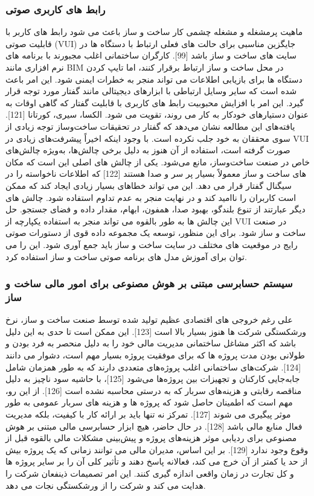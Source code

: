 \documentclass[towcolumn, 11pt]{Article}
\begin{document}
\begin{چکیده}
\subsubsection{رابط های کاربری صوتی}
ماهیت پرمشغله و مشغله چشمی کار ساخت و ساز باعث می شود رابط های کاربر با قابلیت صوتی (VUI) جایگزین مناسبی برای حالت های فعلی ارتباط با دستگاه ها در سایت های ساخت و ساز باشد [99]. کارگران ساختمانی اغلب مجبورند با برنامه های نرم افزاری مانند BIM در محل ساخت و ساز ارتباط برقرار کنند، اما تایپ کردن دستگاه ها برای بازیابی اطلاعات می تواند منجر به خطرات ایمنی شود. این امر باعث شده است که سایر وسایل ارتباطی با ابزارهای دیجیتالی مانند گفتار مورد توجه قرار گیرد. این امر با افزایش محبوبیت رابط های کاربری با قابلیت گفتار که گاهی اوقات به عنوان دستیارهای خودکار به کار می روند، تقویت می شود. الکسا، سیری، کورتانا [121]. یافته‌های این    مطالعه نشان می‌دهد که گفتار در تحقیقات ساخت‌وساز توجه زیادی از سوی محققان به خود جلب نکرده است.
با وجود اینکه اخیراً پیشرفت‌های زیادی در VUI صورت گرفته است، استفاده از آن هنوز به دلیل برخی چالش‌ها، به‌ویژه چالش‌های خاص در صنعت ساخت‌وساز، مانع می‌شود. یکی از چالش های اصلی این است که مکان های  
ساخت و ساز معمولاً بسیار پر سر و صدا هستند [122] که اطلاعات ناخواسته را در سیگنال گفتار قرار می دهد. این می تواند خطاهای بسیار زیادی ایجاد کند که ممکن است کاربران را ناامید کند و در نهایت منجر به عدم تداوم استفاده شود. چالش های دیگر عبارتند از تنوع بلندگو، بهبود صدا، همفون، ابهام، مقدار داده و فضای جستجو. حل این چالش ها به طور بالقوه می تواند منجر به استفاده یکپارچه از VUI در صنعت ساخت و ساز شود. برای این منظور، توسعه یک مجموعه داده قوی از دستورات صوتی رایج در موقعیت های مختلف در سایت ساخت و ساز باید جمع آوری شود. این را می توان برای آموزش مدل های برنامه صوتی ساخت و ساز استفاده کرد. 

\subsubsection{سیستم حسابرسی مبتنی بر هوش مصنوعی برای امور مالی ساخت و ساز}
علی رغم خروجی های اقتصادی عظیم تولید شده توسط صنعت ساخت و ساز، نرخ ورشکستگی شرکت ها هنوز بسیار بالا است [123]. این ممکن است تا حدی به این دلیل باشد که اکثر مشاغل ساختمانی مدیریت مالی خود را به دلیل منحصر به فرد بودن و طولانی بودن مدت پروژه ها که برای موفقیت پروژه بسیار مهم است، دشوار می دانند [124]. شرکت‌های ساختمانی اغلب پروژه‌های متعددی دارند که به طور همزمان شامل جابه‌جایی کارکنان و تجهیزات بین پروژه‌ها می‌شود [125]، با حاشیه سود ناچیز به دلیل مناقصه رقابتی و هزینه‌های سربار که به درستی محاسبه نشده است [126]. از این رو، مهم است که اطمینان حاصل شود که پروژه ها و هزینه های سربار عمومی به طور موثر پیگیری می شوند [127]. تمرکز نه تنها باید بر ارائه کار با کیفیت، بلکه مدیریت فعال منابع مالی باشد [128]. در حال حاضر، هیچ ابزار حسابرسی مالی مبتنی بر هوش مصنوعی برای ردیابی موثر هزینه‌های پروژه و پیش‌بینی مشکلات مالی بالقوه قبل از وقوع وجود ندارد [129]. بر این اساس، مدیران مالی   می توانند زمانی که یک پروژه بیش از حد یا کمتر از آن خرج می کند، فعالانه پاسخ دهند و تأثیر کلی آن را بر سایر پروژه ها و کل تجارت در زمان واقعی اندازه گیری کنند. این امر تصمیمات ذینفعان شرکت را هدایت می کند و شرکت را از ورشکستگی نجات می دهد.


\end{چکیده}
\end{document}
